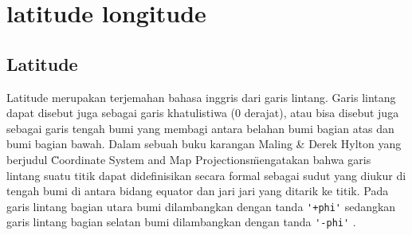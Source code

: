 
\section{latitude longitude}

\subsection{Latitude}
Latitude merupakan terjemahan bahasa inggris dari garis lintang. Garis lintang dapat disebut juga sebagai garis khatulistiwa (0 derajat), atau bisa disebut juga sebagai garis tengah bumi yang membagi antara belahan bumi bagian atas dan bumi bagian bawah.
Dalam sebuah buku karangan Maling \& Derek Hylton yang berjudul \"Coordinate System and Map Projections\" mengatakan bahwa garis lintang suatu titik dapat didefinisikan secara formal sebagai sudut yang diukur di tengah bumi di antara bidang equator dan jari jari yang ditarik ke titik. 
Pada garis lintang bagian utara bumi dilambangkan dengan tanda \verb|'+phi'| 
sedangkan garis lintang bagian selatan bumi dilambangkan dengan tanda \verb|'-phi'| 
\cite{maling2013coordinate}. 

